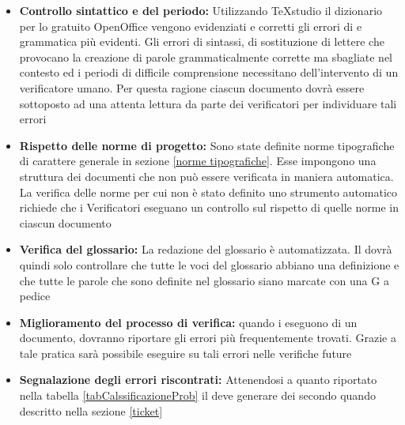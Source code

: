 \documentclass[12pt,a4paper]{article}
\begin{document}
\begin{itemize}
	\item \textbf{Controllo sintattico e del periodo:} Utilizzando TeXstudio il dizionario per lo  gratuito OpenOffice vengono evidenziati e corretti gli errori di  e grammatica più evidenti. Gli errori di sintassi, di sostituzione di lettere che provocano la creazione di parole grammaticalmente corrette ma sbagliate nel contesto ed i periodi di difficile comprensione necessitano dell'intervento di un verificatore umano. Per questa ragione ciascun documento dovrà essere sottoposto ad una attenta lettura da parte dei verificatori per individuare tali errori
	\item \textbf{Rispetto delle norme di progetto:} Sono state definite norme tipografiche di carattere generale in \NdP{} sezione \ref{norme tipografiche}. Esse impongono una struttura dei documenti che non può essere verificata in maniera automatica. La verifica delle norme per cui non è stato definito uno strumento automatico richiede che i Verificatori eseguano un controllo sul rispetto di quelle norme in ciascun documento
	\item \textbf{Verifica del glossario:} La redazione del glossario è automatizzata. Il \VR{} dovrà quindi solo controllare che tutte le voci del glossario abbiano una definizione e che tutte le parole che sono definite nel glossario siano marcate con una G a pedice 
	\item \textbf{Miglioramento del processo di verifica:} quando i \VRpl{} eseguono  di un documento, dovranno riportare gli errori più frequentemente trovati. Grazie a tale pratica sarà possibile eseguire  su tali errori nelle verifiche future
	\item \textbf{Segnalazione degli errori riscontrati:} Attenendosi a quanto riportato nella tabella \ref{tabCalssificazioneProb} il \VR{} deve generare dei  secondo quando descritto nella sezione \ref{ticket}
\end{itemize}
\end{document}
